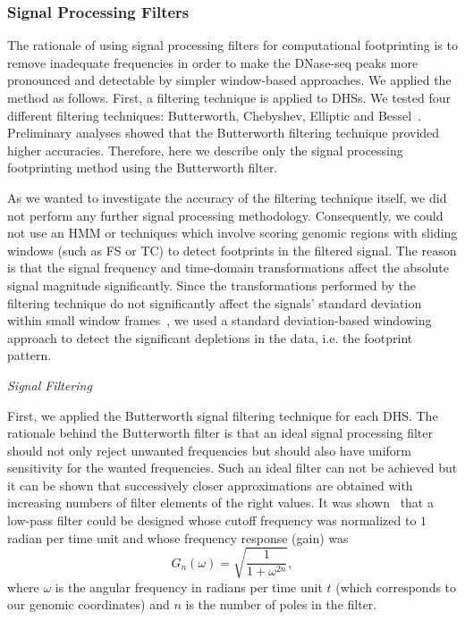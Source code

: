 \subsubsection{Signal Processing Filters}

The rationale of using signal processing filters for computational footprinting is to remove inadequate frequencies in order to make the DNase-seq peaks more pronounced and detectable by simpler window-based approaches. We applied the method as follows. First, a filtering technique is applied to DHSs. We tested four different filtering techniques: Butterworth, Chebyshev, Elliptic and Bessel~\citep{lutovac2000}. Preliminary analyses showed that the Butterworth filtering technique provided higher accuracies. Therefore, here we describe only the signal processing footprinting method using the Butterworth filter.

As we wanted to investigate the accuracy of the filtering technique itself, we did not perform any further signal processing methodology. Consequently, we could not use an HMM or techniques which involve scoring genomic regions with sliding windows (such as FS or TC) to detect footprints in the filtered signal. The reason is that the signal frequency and time-domain transformations affect the absolute signal magnitude significantly. Since the transformations performed by the filtering technique do not significantly affect the signals' standard deviation within small window frames~\citep{shenoi2005}, we used a standard deviation-based windowing approach to detect the significant depletions in the data, i.e. the footprint pattern.

\vspace{0.5cm}
\noindent
\emph{Signal Filtering}
\vspace{0.3cm}

\noindent
First, we applied the Butterworth signal filtering technique for each DHS. The rationale behind the Butterworth filter is that an ideal signal processing filter should not only reject unwanted frequencies but should also have uniform sensitivity for the wanted frequencies. Such an ideal filter can not be achieved but it can be shown that successively closer approximations are obtained with increasing numbers of filter elements of the right values. It was shown~\citep{shenoi2005} that a low-pass filter could be designed whose cutoff frequency was normalized to $1$ radian per time unit and whose frequency response (gain) was
\begin{equation}
  \label{eq:butterworth1}
  G_n(\omega) = \sqrt{\frac{1}{{1+\omega^{2n}}}},
\end{equation}
where $ \omega $ is the angular frequency in radians per time unit $ t $ (which corresponds to our genomic coordinates) and $n$ is the number of poles in the filter.

